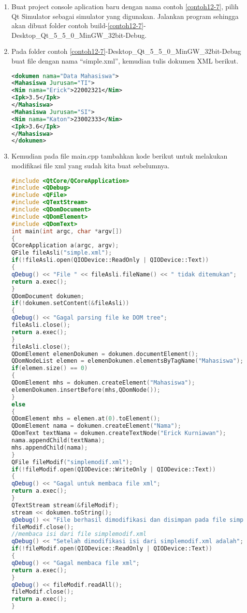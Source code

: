 \begin{enumerate}


\item
  Buat project console aplication baru dengan nama contoh \ref{contoh12-7}, pilih Qt
  Simulator sebagai simulator yang digunakan. Jalankan program sehingga
  akan dibuat folder contoh build-\ref{contoh12-7}-Desktop\_Qt\_5\_5\_0\_MinGW\_32bit-Debug.
\item
  Pada folder contoh \ref{contoh12-7}-Desktop\_Qt\_5\_5\_0\_MinGW\_32bit-Debug buat file dengan nama
  ``simple.xml'', kemudian tulis dokumen XML berikut.

\begin{lstlisting}[language=xml]
<dokumen nama="Data Mahasiswa">
<Mahasiswa Jurusan="TI">
<Nim nama="Erick">22002321</Nim>
<Ipk>3.5</Ipk>
</Mahasiswa>
<Mahasiswa Jurusan="SI">
<Nim nama="Katon">23002333</Nim>
<Ipk>3.6</Ipk>
</Mahasiswa>
</dokumen>
\end{lstlisting}

\item
  Kemudian pada file main.cpp tambahkan kode berikut untuk melakukan
  modifikasi file xml yang sudah kita buat sebelumnya.

\begin{lstlisting}[language=c++, caption=Main program Modifikasi data dokumen XML, label=contoh12-7]
#include <QtCore/QCoreApplication>
#include <QDebug>
#include <QFile>
#include <QTextStream>
#include <QDomDocument>
#include <QDomElement>
#include <QDomText>
int main(int argc, char *argv[])
{
QCoreApplication a(argc, argv);
QFile fileAsli("simple.xml");
if(!fileAsli.open(QIODevice::ReadOnly | QIODevice::Text))
{
qDebug() << "File " << fileAsli.fileName() << " tidak ditemukan";
return a.exec();
}
QDomDocument dokumen;
if(!dokumen.setContent(&fileAsli))
{
qDebug() << "Gagal parsing file ke DOM tree";
fileAsli.close();
return a.exec();
}
fileAsli.close();
QDomElement elemenDokumen = dokumen.documentElement();
QDomNodeList elemen = elemenDokumen.elementsByTagName("Mahasiswa");
if(elemen.size() == 0)
{
QDomElement mhs = dokumen.createElement("Mahasiswa");
elemenDokumen.insertBefore(mhs,QDomNode());
}
else
{
QDomElement mhs = elemen.at(0).toElement();
QDomElement nama = dokumen.createElement("Nama");
QDomText textNama = dokumen.createTextNode("Erick Kurniawan");
nama.appendChild(textNama);
mhs.appendChild(nama);
}
QFile fileModif("simplemodif.xml");
if(!fileModif.open(QIODevice::WriteOnly | QIODevice::Text))
{
qDebug() << "Gagal untuk membaca file xml";
return a.exec();
}
QTextStream stream(&fileModif);
stream << dokumen.toString();
qDebug() << "File berhasil dimodifikasi dan disimpan pada file simplemodif.xml";
fileModif.close();
//membaca isi dari file simplemodif.xml
qDebug() << "Setelah dimodifikasi isi dari simplemodif.xml adalah";
if(!fileModif.open(QIODevice::ReadOnly | QIODevice::Text))
{
qDebug() << "Gagal membaca file xml";
return a.exec();
}
qDebug() << fileModif.readAll();
fileModif.close();
return a.exec();
}
\end{lstlisting}




\end{enumerate}
